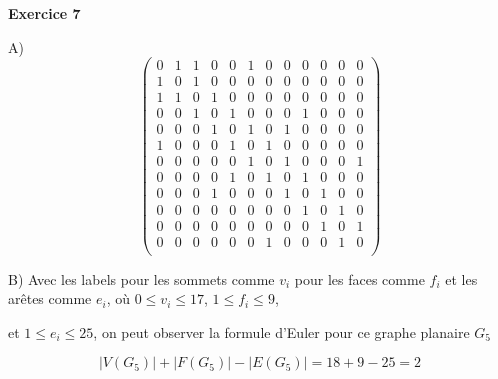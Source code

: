 \documentclass{article}
\begin{document}
\textbf{Exercice 7}

\vspace{0.5cm}
A)
\[
\left(
\begin{array}{*{12}{c}}
0 & 1 & 1 & 0 & 0 & 1 & 0 & 0 & 0 & 0 & 0 & 0\\
1 & 0 & 1 & 0 & 0 & 0 & 0 & 0 & 0 & 0 & 0 & 0\\
1 & 1 & 0 & 1 & 0 & 0 & 0 & 0 & 0 & 0 & 0 & 0\\
0 & 0 & 1 & 0 & 1 & 0 & 0 & 0 & 1 & 0 & 0 & 0\\
0 & 0 & 0 & 1 & 0 & 1 & 0 & 1 & 0 & 0 & 0 & 0\\
1 & 0 & 0 & 0 & 1 & 0 & 1 & 0 & 0 & 0 & 0 & 0\\
0 & 0 & 0 & 0 & 0 & 1 & 0 & 1 & 0 & 0 & 0 & 1\\
0 & 0 & 0 & 0 & 1 & 0 & 1 & 0 & 1 & 0 & 0 & 0\\ 
0 & 0 & 0 & 1 & 0 & 0 & 0 & 1 & 0 & 1 & 0 & 0\\ 
0 & 0 & 0 & 0 & 0 & 0 & 0 & 0 & 1 & 0 & 1 & 0\\ 
0 & 0 & 0 & 0 & 0 & 0 & 0 & 0 & 0 & 1 & 0 & 1\\
0 & 0 & 0 & 0 & 0 & 0 & 1 & 0 & 0 & 0 & 1 & 0\\
\end{array}
\right)
\]
\vspace{0.5cm}

B)
Avec les labels pour les sommets comme $v_i$ pour les faces comme $f_i$ et les arêtes comme $e_i$, où $0 \leq v_i \leq 17$, $1 \leq f_i \leq 9$, 

et $1 \leq e_i \leq 25$, on peut observer la formule d'Euler pour ce graphe planaire $G_5$

$$|V(G_5)| + |F(G_5)|- |E(G_5)| = 18 + 9 - 25= 2$$
\end{document}

